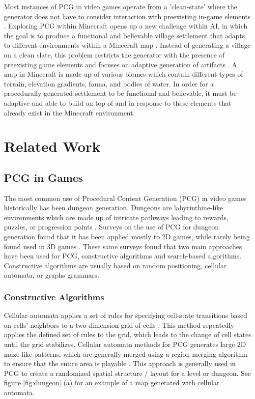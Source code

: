 \documentclass[11pt, oneside]{article}
\begin{document}
\begin{normalsize}
Most instances of PCG in video games operate from a 'clean-state' where the generator does not have to consider interaction with preexisting in-game elements \cite{green_organic_2019}. Exploring PCG within Minecraft opens up a new challenge within AI, in which the goal is to produce a functional and believable village settlement that adapts to different environments within a Minecraft map \cite{salge_generative_2019}. Instead of generating a village on a clean slate, this problem restricts the generator with the presence of preexisting game elements and focuses on adaptive generation of artifacts \cite{green_organic_2019}. A map in Minecraft is made up of various biomes which contain different types of terrain, elevation gradients, fauna, and bodies of water. In order for a procedurally generated settlement to be functional and believable, it must be adaptive and able to build on top of and in response to these elements that already exist in the Minecraft environment. 


\section{Related Work}
\label{Related Work}

\subsection{PCG in Games}

The most common use of Procedural Content Generation (PCG) in video games historically has been dungeon generation. Dungeons are labyrinthine-like environments which are made up of intricate pathways leading to rewards, puzzles, or progression points \cite{van2013procedural}. Surveys on the use of PCG for dungeon generation found that it has been applied mostly to 2D games, while rarely being found used in 3D games \cite{viana2019survey}. These same surveys found that two main approaches have been used for PCG, constructive algorithms and search-based algorithms. Constructive algorithms are usually based on random positioning, cellular automata, or graphs grammars. 

\subsubsection{Constructive Algorithms}
Cellular automata applies a set of rules for specifying cell-state transitions based on cells' neighbors to a two dimension grid of cells \cite{adams2017procedural}. This method repeatedly applies the defined set of rules to the grid, which leads to the change of cell states until the grid stabilizes. Cellular automata methods for PCG generates large 2D maze-like patterns, which are generally merged using a region merging algorithm to ensure that the entire area is playable \cite{adams2017procedural}. This approach is generally used in PCG to create a randomized spatial structure / layout for a level or dungeon. See figure \ref{fig:dungeon} (a) for an example of a map generated with cellular automata.


\end{normalsize}
\end{document}
